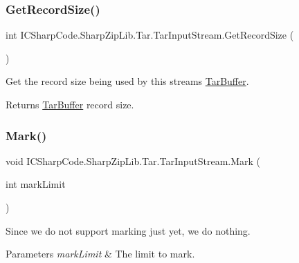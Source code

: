 \subsubsection{\texorpdfstring{Get\+Record\+Size()}{GetRecordSize()}}
{\footnotesize\ttfamily int I\+C\+Sharp\+Code.\+Sharp\+Zip\+Lib.\+Tar.\+Tar\+Input\+Stream.\+Get\+Record\+Size (\begin{DoxyParamCaption}{ }\end{DoxyParamCaption})\hspace{0.3cm}{\ttfamily [inline]}}



Get the record size being used by this stream\textquotesingle{}s \hyperlink{class_i_c_sharp_code_1_1_sharp_zip_lib_1_1_tar_1_1_tar_buffer}{Tar\+Buffer}. 

\begin{DoxyReturn}{Returns}
\hyperlink{class_i_c_sharp_code_1_1_sharp_zip_lib_1_1_tar_1_1_tar_buffer}{Tar\+Buffer} record size. 
\end{DoxyReturn}
\mbox{\label{class_i_c_sharp_code_1_1_sharp_zip_lib_1_1_tar_1_1_tar_input_stream_afd48ac983df597a6b5f1e7ecc175a28d}} 
\subsubsection{\texorpdfstring{Mark()}{Mark()}}
{\footnotesize\ttfamily void I\+C\+Sharp\+Code.\+Sharp\+Zip\+Lib.\+Tar.\+Tar\+Input\+Stream.\+Mark (\begin{DoxyParamCaption}\item[{int}]{mark\+Limit }\end{DoxyParamCaption})\hspace{0.3cm}{\ttfamily [inline]}}



Since we do not support marking just yet, we do nothing. 


\begin{DoxyParams}{Parameters}
{\em mark\+Limit} & The limit to mark. \\
\hline
\end{DoxyParams}
\mbox{\label{class_i_c_sharp_code_1_1_sharp_zip_lib_1_1_tar_1_1_tar_input_stream_abbab3727270372439fd6c0646f66d431}} 

